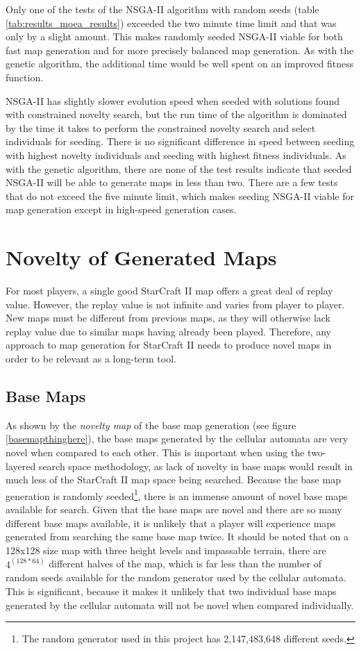 Only one of the tests of the NSGA-II algorithm with random seeds (table \ref{tab:results_moea_results}) exceeded the two minute time limit and that was only by a slight amount. This makes randomly seeded NSGA-II viable for both fast map generation and for more precisely balanced map generation. As with the genetic algorithm, the additional time would be well spent on an improved fitness function.

NSGA-II has slightly slower evolution speed when seeded with solutions found with constrained novelty search, but the run time of the algorithm is dominated by the time it takes to perform the constrained novelty search and select individuals for seeding. There is no significant difference in speed between seeding with highest novelty individuals and seeding with highest fitness individuals. As with the genetic algorithm, there are none of the test results indicate that seeded NSGA-II will be able to generate maps in less than two. There are a few tests that do not exceed the five minute limit, which makes seeding NSGA-II viable for map generation except in high-speed generation cases.

\section{Novelty of Generated Maps}
\label{discussion_novelty}
For most players, a single good StarCraft II map offers a great deal of replay value. However, the replay value is not infinite and varies from player to player. New maps must be different from previous maps, as they will otherwise lack replay value due to similar maps having already been played. Therefore, any approach to map generation for StarCraft II needs to produce novel maps in order to be relevant as a long-term tool.

\subsection{Base Maps}
\label{discussion_novelty_basemaps}
As shown by the \textit{novelty map} of the base map generation (see figure \ref{basemapthinghere}), the base maps generated by the cellular automata are very novel when compared to each other. This is important when using the two-layered search space methodology, as lack of novelty in base maps would result in much less of the StarCraft II map space being searched. Because the base map generation is randomly seeded\footnote{The random generator used in this project has 2,147,483,648 different seeds.}, there is an immense amount of novel base maps available for search. Given that the base maps are novel and there are so many different base maps available, it is unlikely that a player will experience maps generated from searching the same base map twice. It should be noted that on a 128x128 size map with three height levels and impassable terrain, there are $4^{(128*64)}$ different halves of the map, which is far less than the number of random seeds available for the random generator used by the cellular automata. This is significant, because it makes it unlikely that two individual base maps generated by the cellular automata will not be novel when compared individually.

